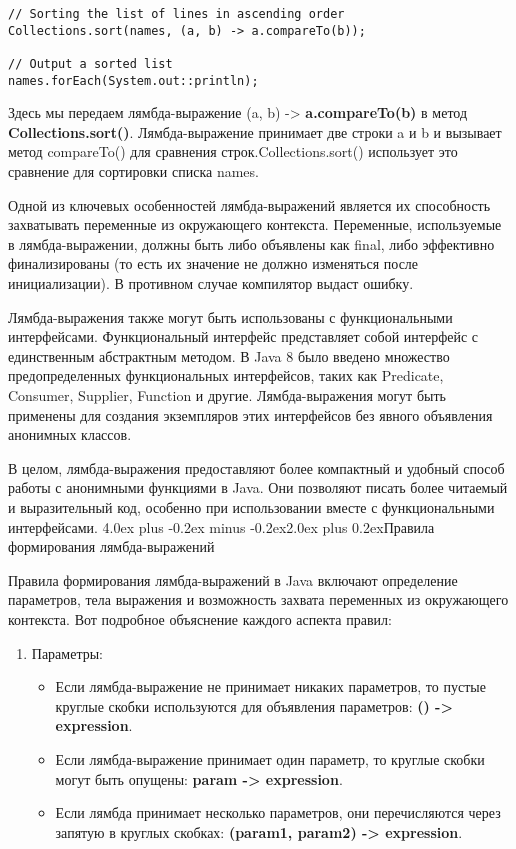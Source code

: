 \documentclass[12pt, a4paper]{book}%
\makeatletter
\renewcommand{\section}{\@startsection{section}{1}{1pt}%
{4.0ex plus -0.2ex minus -0.2ex}{2.0ex plus 0.2ex}{\centering\bf}}%
\makeatother
\begin{document}
{\begin{lstlisting}
// Sorting the list of lines in ascending order
Collections.sort(names, (a, b) -> a.compareTo(b));

// Output a sorted list
names.forEach(System.out::println);
\end{lstlisting}
Здесь мы передаем лямбда-выражение (a, b) -> {\bf a.compareTo(b)} в метод {\bf Collections.sort()}. Лямбда-выражение принимает две строки a и b и вызывает метод compareTo() для сравнения строк.Collections.sort() использует это сравнение для сортировки списка names.

Одной из ключевых особенностей лямбда-выражений является их способность захватывать переменные из окружающего контекста. Переменные, используемые в лямбда-выражении, должны быть либо объявлены как final, либо эффективно финализированы (то есть их значение не должно изменяться после инициализации). В противном случае компилятор выдаст ошибку.

Лямбда-выражения также могут быть использованы с функциональными интерфейсами. Функциональный интерфейс представляет собой интерфейс с единственным абстрактным методом. В Java 8 было введено множество предопределенных функциональных интерфейсов, таких как Predicate, Consumer, Supplier, Function и другие. Лямбда-выражения могут быть применены для создания экземпляров этих интерфейсов без явного объявления анонимных классов.

В целом, лямбда-выражения предоставляют более компактный и удобный способ работы с анонимными функциями в Java. Они позволяют писать более читаемый и выразительный код, особенно при использовании вместе с функциональными интерфейсами.
\section{Правила формирования лямбда-выражений}

Правила формирования лямбда-выражений в Java включают определение параметров, тела выражения и возможность захвата переменных из окружающего контекста. Вот подробное объяснение каждого аспекта правил:
\begin{enumerate} 
  \item Параметры:
  \begin{itemize} 
    \item Если лямбда-выражение не принимает никаких параметров, то пустые круглые скобки используются для объявления параметров: {\bf () -> expression}.
    \item Если лямбда-выражение принимает один параметр, то круглые скобки могут быть опущены: {\bf param -> expression}.
    \item Если лямбда принимает несколько параметров, они перечисляются через запятую в круглых скобках:
    {\bf (param1, param2) -> expression}.
    \end{itemize}


\end{enumerate}}
\end{document}
